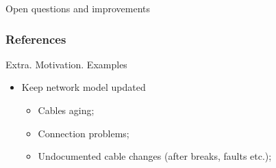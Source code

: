 \documentclass[../main.tex]{subfiles}
\begin{document}
\begin{frame}[fragile]{Open questions and improvements}
\end{frame}


\begin{frame}[t, allowframebreaks]
\frametitle{References}


\end{frame}

\backupbegin

\begin{frame}[t]
\end{frame}

\begin{frame}[t]{Extra. Motivation. Examples}
\begin{itemize}
\item Keep network model updated
\begin{itemize}
\item Cables aging;
\item Connection problems;
\item Undocumented cable changes (after breaks, faults etc.);
\end{itemize}
\end{itemize}
\end{frame}
\end{document}
